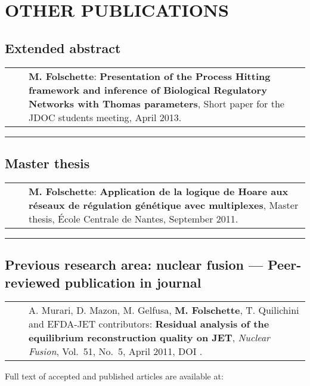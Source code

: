 \documentclass[11pt,a4paper,sans]{moderncv} %
\makeatletter
\renewcommand{\emph}{\textbf}
\newcommand{\mybluerule}{\vspace*{5pt}\textcolor{color1}{\rule{\textwidth}{.5pt}}\vspace*{-2pt}}
\newlength{\listitemsymbolwidthsep}
\newenvironment{publist}%
{\begin{tabular}{r@{}p{.935\textwidth}}\hspace{-\listitemsymbolwidthsep}\hspace{.45\hintscolumnwidth}}%
{\end{tabular}}
\newcommand{\newpub}[1]{\vspace{1pt}\begin{publist}\listitemsymbol~~&#1\end{publist}\vspace{1pt}}
\newcommand{\cvsectionvspace}{\vspace{.4cm}}
\newenvironment{cvsplitsection}[1]{%
  \cvsectionvspace
  \section{#1}%
}{}
\newenvironment{cvsection}[1]{%
  \cvsectionvspace
  \begin{minipage}{\textwidth}
  \section{#1}%
}{%
  \end{minipage}
}
\newenvironment{cvsubsection}[1]{%
  \vspace*{4pt}
  \begin{minipage}{\textwidth}
  \subsection{#1}%
}{%
  \end{minipage}
}
\newenvironment{cvsubsectionrule}[1]{%
  \begin{minipage}{\textwidth}
  \mybluerule
  \subsection{#1}%
}{%
  \end{minipage}
}
\newcommand{\vol}{Vol.\ }
\newcommand{\no}{No.\ }
\makeatother
\begin{document}
\begin{cvsplitsection}{OTHER PUBLICATIONS}

\begin{cvsubsection}{Extended abstract}

\newpub{\emph{M. Folschette}:
  \emph{Presentation of the Process Hitting framework and inference of Biological Regulatory Networks with Thomas parameters},
  Short paper for the JDOC students meeting, April 2013.}

\end{cvsubsection}

\begin{cvsubsectionrule}{Master thesis}

\newpub{\emph{M. Folschette}:
  \emph{Application de la logique de Hoare aux réseaux de régulation génétique avec multiplexes},
  Master thesis, École Centrale de Nantes, September 2011.}

\end{cvsubsectionrule}



\begin{cvsubsectionrule}{Previous research area: nuclear fusion --- Peer-reviewed publication in journal}

\newpub{A. Murari, D. Mazon, M. Gelfusa, \emph{M. Folschette}, T. Quilichini and EFDA-JET contributors: %
  \emph{Residual analysis of the equilibrium reconstruction quality on JET}, \textit{Nuclear Fusion}, %
  \vol 51, \no 5, April 2011, DOI \httplink[10.1088/0029-5515/51/5/053012]{dx.doi.org/10.1088/0029-5515/51/5/053012}.}

\end{cvsubsectionrule}
\end{cvsplitsection}

\vfill

Full text of accepted and published articles are available at: \quad
\texttt{}
\end{document}
